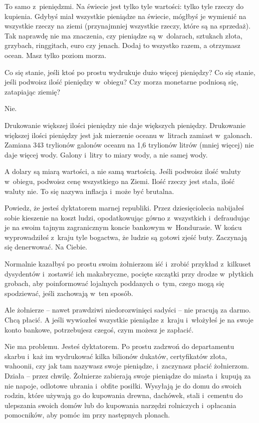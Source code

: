 \documentclass[oneside,polish,11pt,rmheadings]{mwbk}
\begin{document}
To samo z~pieniędzmi. Na świecie jest tylko tyle wartości: tylko tyle rzeczy do kupienia. Gdybyś miał wszystkie pieniądze na świecie, mógłbyś je wymienić na wszystkie rzeczy na ziemi (przynajmniej wszystkie rzeczy, które są na sprzedaż). Tak naprawdę nie ma znaczenia, czy pieniądze są w~dolarach, sztukach złota, grzybach, ringgitach, euro czy jenach. Dodaj to wszystko razem, a otrzymasz ocean. Masz tylko poziom morza.

Co się stanie, jeśli ktoś po prostu wydrukuje dużo więcej pieniędzy? Co się stanie, jeśli podwoisz ilość pieniędzy w~obiegu? Czy morza monetarne podniosą się, zatapiając ziemię?

Nie.

Drukowanie większej ilości pieniędzy nie daje większych pieniędzy. Drukowanie większej ilości pieniędzy jest jak mierzenie oceanu w~litrach zamiast w~galonach. Zamiana 343 trylionów galonów oceanu na 1,6 trylionów litrów (mniej więcej) nie daje więcej wody. Galony i~litry to miary wody, a nie samej wody.

A dolary są miarą wartości, a nie samą wartością. Jeśli podwoisz ilość waluty w~obiegu, podwoisz cenę wszystkiego na Ziemi. Ilość rzeczy jest stała, ilość waluty nie. To się nazywa inflacja i~może być brutalna.

Powiedz, że jesteś dyktatorem marnej republiki. Przez dziesięciolecia nabijałeś sobie kieszenie na koszt ludzi, opodatkowując gówno z~wszystkich i~defraudując je na swoim tajnym zagranicznym koncie bankowym w~Hondurasie. W końcu wyprowadziłeś z~kraju tyle bogactwa, że ludzie są gotowi zjeść buty. Zaczynają się denerwować. Na Ciebie.

Normalnie kazałbyś po prostu swoim żołnierzom iść i~zrobić przykład z~kilkuset dysydentów i~zostawić ich makabryczne, pocięte szczątki przy drodze w~płytkich grobach, aby poinformować lojalnych poddanych o~tym, czego mogą się spodziewać, jeśli zachowają w~ten sposób.

Ale żołnierze -- nawet prawdziwi niedorozwinięci sadyści -- nie pracują za darmo. Chcą płacić. A jeśli wywiozłeś wszystkie pieniądze z~kraju i~włożyłeś je na swoje konto bankowe, potrzebujesz czegoś, czym możesz je zapłacić.

Nie ma problemu. Jesteś dyktatorem. Po prostu zadzwoń do departamentu skarbu i~każ im wydrukować kilka bilionów dukatów, certyfikatów złota, wahoonii, czy jak tam nazywasz swoje pieniądze, i~zaczynasz płacić żołnierzom. Działa -- przez chwilę. Żołnierze zabierają swoje pieniądze do miasta i~kupują za nie napoje, odlotowe ubrania i~obfite posiłki. Wysyłają je do domu do swoich rodzin, które używają go do kupowania drewna, dachówek, stali i~cementu do ulepszania swoich domów lub do kupowania narzędzi rolniczych i~opłacania pomocników, aby pomóc im przy następnych plonach.
\end{document}

